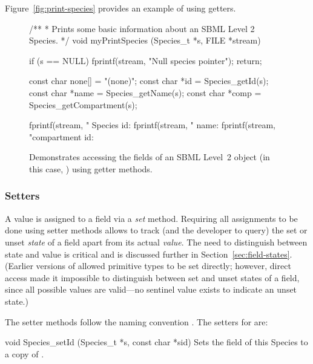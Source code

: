 \documentclass{sbmlmanual}
\begin{document}
Figure~\vref{fig:print-species} provides an example of using getters. 

\begin{figure}[thb]
  \begin{codeVerbatim}
/** 
 * Prints some basic information about an SBML Level 2 Species.
 */
void
myPrintSpecies (Species_t *s, FILE *stream)
{
  if (s == NULL)
  {
    fprintf(stream, "Null species pointer\n");
    return;
  }

  const char none[] = "(none)";
  const char *id      = Species_getId(s);
  const char *name    = Species_getName(s);
  const char *comp    = Species_getCompartment(s);

  fprintf(stream, "      Species id: %
  fprintf(stream, "             name: %
  fprintf(stream, "compartment id: %
}
  \end{codeVerbatim}
  \caption{Demonstrates accessing the fields of an SBML Level~2 object
  (in this case, ) using getter methods.}
  \label{fig:print-species}
\end{figure}


\subsubsection{Setters}

A value is assigned to a field via a \emph{set} method.  Requiring all
assignments to be done using setter methods allows \libsbml{} to track (and
the developer to query) the set or unset \emph{state} of a field apart from
its actual \emph{value}.  The need to distinguish between state and value
is critical and is discussed further in Section~\ref{sec:field-states}.
(Earlier versions of \libsbml{} allowed primitive types to be set directly;
however, direct access made it impossible to distinguish between set and
unset states of a field, since all possible values are valid---no sentinel
value exists to indicate an unset state.)

The setter methods follow the naming convention .
The setters for  are:


\begin{methoddef}{void Species\_setId (Species\_t *s, const char *sid)}
  Sets the  field of this Species to a copy of .
\end{methoddef}
\end{document}
